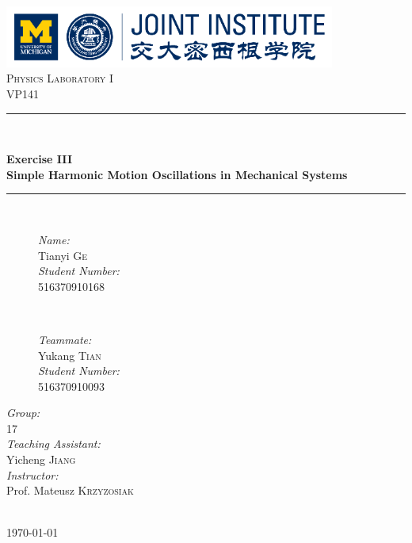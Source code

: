 \begin{titlepage}

\newcommand{\HRule}{\rule{\linewidth}{0.5mm}}

\center

\includegraphics[height=0.8in]{images/logo.png}\\[1cm]

\textsc{\Large Physics Laboratory I}\\[0.4cm]
\textsc{\large VP141}\\[0.4cm]

\HRule \\[0.4cm]
{
    \bfseries
    {\huge Exercise III}\\[0.3cm]
    {\large Simple Harmonic Motion Oscillations in Mechanical Systems}\\[0.2cm]
    \HRule \\[1.5cm]
}
\begin{figure}[h]
    \hspace{3cm}
    \begin{minipage}{0.4\textwidth}
        \large
        \emph{Name:}\\
        Tianyi \textsc{Ge} \\

        \emph{Student Number:}\\
        516370910168
    \end{minipage}
    ~
    \begin{minipage}{0.4\textwidth}
        \large
        \emph{Teammate:}\\
        Yukang \textsc{Tian} \\

        \emph{Student Number:}\\
        516370910093
    \end{minipage}
\end{figure}

\vspace{1cm}

\begin{minipage}{0.4\textwidth}
    \large
    \emph{Group:}\\
    17\\

    \emph{Teaching Assistant:}\\
    Yicheng \textsc{Jiang}\\

    \emph{Instructor:}\\
    Prof. Mateusz \textsc{Krzyzosiak}
\end{minipage}\\[2cm]

{\large \today}\\[2cm]

\vfill

\end{titlepage}

\tableofcontents
\clearpage